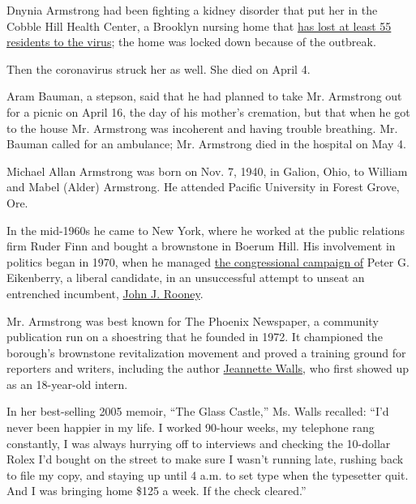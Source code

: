 Dnynia Armstrong had been fighting a kidney disorder that put her in the
Cobble Hill Health Center, a Brooklyn nursing home that
\href{https://www.nytimes.com/2020/04/17/nyregion/new-york-nursing-homes-coronavirus-deaths.html}{has
lost at least 55 residents to the virus}; the home was locked down
because of the outbreak.

Then the coronavirus struck her as well. She died on April 4.

Aram Bauman, a stepson, said that he had planned to take Mr. Armstrong
out for a picnic on April 16, the day of his mother's cremation, but
that when he got to the house Mr. Armstrong was incoherent and having
trouble breathing. Mr. Bauman called for an ambulance; Mr. Armstrong
died in the hospital on May 4.

Michael Allan Armstrong was born on Nov. 7, 1940, in Galion, Ohio, to
William and Mabel (Alder) Armstrong. He attended Pacific University in
Forest Grove, Ore.

In the mid-1960s he came to New York, where he worked at the public
relations firm Ruder Finn and bought a brownstone in Boerum Hill. His
involvement in politics began in 1970, when he managed
\href{https://www.nytimes.com/1970/06/14/archives/students-work-for-rooney-rival-eikenberrys-stand-against-war-stirs.html}{the
congressional campaign of} Peter G. Eikenberry, a liberal candidate, in
an unsuccessful attempt to unseat an entrenched incumbent,
\href{https://www.nytimes.com/1975/10/28/archives/exrep-john-j-rooney-of-brooklyn-is-dead-at-71.html}{John
J. Rooney}.

Mr. Armstrong was best known for The Phoenix Newspaper, a community
publication run on a shoestring that he founded in 1972. It championed
the borough's brownstone revitalization movement and proved a training
ground for reporters and writers, including the author
\href{https://www.nytimes.com/2013/05/26/magazine/how-jeannette-walls-spins-good-stories-out-of-bad-memories.html}{Jeannette
Walls}, who first showed up as an 18-year-old intern.

In her best-selling 2005 memoir, ``The Glass Castle,'' Ms. Walls
recalled: ``I'd never been happier in my life. I worked 90-hour weeks,
my telephone rang constantly, I was always hurrying off to interviews
and checking the 10-dollar Rolex I'd bought on the street to make sure I
wasn't running late, rushing back to file my copy, and staying up until
4 a.m. to set type when the typesetter quit. And I was bringing home
\$125 a week. If the check cleared.''

